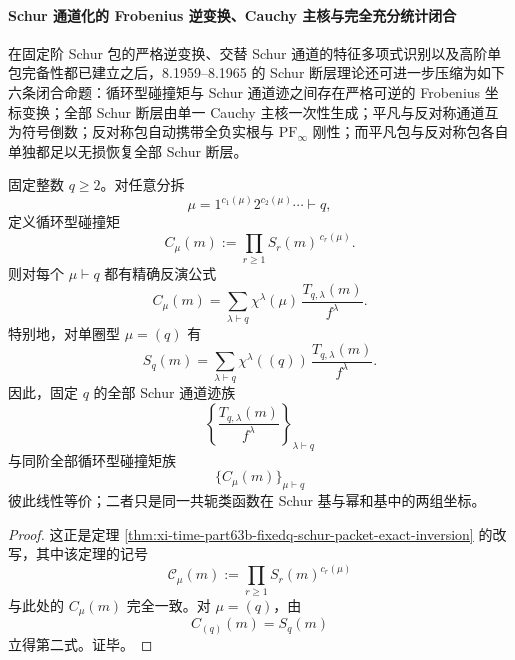 \paragraph{Schur 通道化的 Frobenius 逆变换、Cauchy 主核与完全充分统计闭合}
在固定阶 Schur 包的严格逆变换、交替 Schur 通道的特征多项式识别以及高阶单包完备性都已建立之后，8.1959--8.1965 的 Schur 断层理论还可进一步压缩为如下六条闭合命题：循环型碰撞矩与 Schur 通道迹之间存在严格可逆的 Frobenius 坐标变换；全部 Schur 断层由单一 Cauchy 主核一次性生成；平凡与反对称通道互为符号倒数；反对称包自动携带全负实根与 \(\mathrm{PF}_\infty\) 刚性；而平凡包与反对称包各自单独都足以无损恢复全部 Schur 断层。

\begin{theorem}\label{thm:xi-time-part63c-frobenius-exact-inversion-cycle-moments}
固定整数 \(q\ge 2\)。对任意分拆
\[
\mu=1^{c_1(\mu)}2^{c_2(\mu)}\cdots\vdash q,
\]
定义循环型碰撞矩
\[
C_\mu(m):=\prod_{r\ge 1}S_r(m)^{\,c_r(\mu)}.
\]
则对每个 \(\mu\vdash q\) 都有精确反演公式
\[
\boxed{\;
C_\mu(m)
=
\sum_{\lambda\vdash q}\chi^\lambda(\mu)\,\frac{T_{q,\lambda}(m)}{f^\lambda}.\;}
\]
特别地，对单圈型 \(\mu=(q)\) 有
\[
\boxed{\;
S_q(m)
=
\sum_{\lambda\vdash q}\chi^\lambda((q))\,\frac{T_{q,\lambda}(m)}{f^\lambda}.\;}
\]
因此，固定 \(q\) 的全部 Schur 通道迹族
\[
\left\{\frac{T_{q,\lambda}(m)}{f^\lambda}\right\}_{\lambda\vdash q}
\]
与同阶全部循环型碰撞矩族
\[
\{C_\mu(m)\}_{\mu\vdash q}
\]
彼此线性等价；二者只是同一共轭类函数在 Schur 基与幂和基中的两组坐标。
\end{theorem}
\begin{proof}
这正是定理 \ref{thm:xi-time-part63b-fixedq-schur-packet-exact-inversion} 的改写，其中该定理的记号
\[
\mathcal C_\mu(m):=\prod_{r\ge 1}S_r(m)^{c_r(\mu)}
\]
与此处的 \(C_\mu(m)\) 完全一致。对 \(\mu=(q)\)，由
\[
C_{(q)}(m)=S_q(m)
\]
立得第二式。证毕。
\end{proof}

